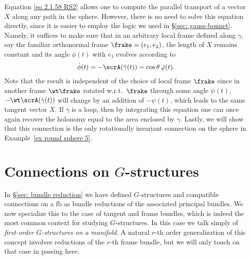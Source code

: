 \begin{example}
    Equation \eqref{eq 2.1.58 RS2} allows one to compute the parallel transport of a vector $X$ along any path in the sphere. However, there is no need to solve this equation directly, since it is easier to employ the logic we used in \S\ref{sec: gauss-bonnet}. Namely, it suffices to make sure that in an arbitrary local frame defined along $\gamma$, say the familiar orthonormal frame $\frake=(e_1,e_2)$, the length of $X$ remains constant and its angle $\phi(t)$ with $e_1$ evolves according to 
    \[\dot\phi(t)=-\scrA(\dot\gamma(t))=\cos\theta \,\dot\varphi(t).\]
    Note that the result is independent of the choice of local frame $\frake$ since in another frame $\wt\frake$ rotated w.r.t.\ $\frake$ through some angle $\psi(t)$, $-\wt\scrA(\dot\gamma(t))$ will change by an addition of $-\dot\psi(t)$, which leads to the same tangent vector $X$. If $\gamma$ is a loop, then by integrating this equation one can once again recover the holonomy equal to the area enclosed by $\gamma$.
    Lastly, we will show that this connection is the only rotationally invariant connection on the sphere in Example~\ref{ex round sphere 5}.
\end{example}





\section{Connections on \texorpdfstring{$G$}{G}-structures}\label{sec: connections on G-structures}

In \S\ref{sec: bundle reduction} we have defined $G$-structures and compatible connections on a \gls{fb} as bundle reductions of the associated principal bundles. We now specialize this to the case of tangent and frame bundles, which is indeed the most common context for studying $G$-structures. In this case we talk simply of \emph{first-order $G$-structures on a manifold}. A natural $r$-th order generalization of this concept involves reductions of the $r$-th frame bundle, but we will only touch on that case in passing here.

